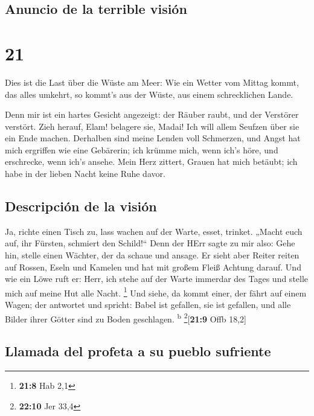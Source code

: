 \hypertarget{anuncio-de-la-terrible-visiuxf3n}{%
\subsection{Anuncio de la terrible
visión}\label{anuncio-de-la-terrible-visiuxf3n}}

\hypertarget{section-20}{%
\section{21}\label{section-20}}

 Dies ist die Last über die Wüste am Meer: Wie ein Wetter
vom Mittag kommt, das alles umkehrt, so kommt's aus der Wüste, aus einem
schrecklichen Lande.

 Denn mir ist ein hartes Gesicht angezeigt: der Räuber
raubt, und der Verstörer verstört. Zieh herauf, Elam! belagere sie,
Madai! Ich will allem Seufzen über sie ein Ende machen. 
Derhalben sind meine Lenden voll Schmerzen, und Angst hat mich ergriffen
wie eine Gebärerin; ich krümme mich, wenn ich's höre, und erschrecke,
wenn ich's ansehe.  Mein Herz zittert, Grauen hat mich
betäubt; ich habe in der lieben Nacht keine Ruhe davor.

\hypertarget{descripciuxf3n-de-la-visiuxf3n}{%
\subsection{Descripción de la
visión}\label{descripciuxf3n-de-la-visiuxf3n}}

 Ja, richte einen Tisch zu, lass wachen auf der Warte,
esset, trinket. „Macht euch auf, ihr Fürsten, schmiert den Schild!{}``
 Denn der HErr sagte zu mir also: Gehe hin, stelle einen
Wächter, der da schaue und ansage.  Er sieht aber Reiter
reiten auf Rossen, Eseln und Kamelen und hat mit großem Fleiß Achtung
darauf.  Und wie ein Löwe ruft er: Herr, ich stehe auf der
Warte immerdar des Tages und stelle mich auf meine Hut alle Nacht.
\footnote{\textbf{21:8} Hab 2,1}  Und siehe, da kommt
einer, der fährt auf einem Wagen; der antwortet und spricht: Babel ist
gefallen, sie ist gefallen, und alle Bilder ihrer Götter sind zu Boden
geschlagen. \textsuperscript{b} \footnote{\textbf{22:10} Jer 33,4}{[}\textbf{21:9}
Offb 18,2{]}

\hypertarget{llamada-del-profeta-a-su-pueblo-sufriente}{%
\subsection{Llamada del profeta a su pueblo
sufriente}\label{llamada-del-profeta-a-su-pueblo-sufriente}}


